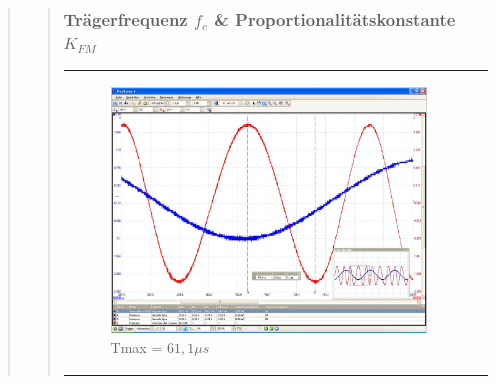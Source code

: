 \begin{quote}
\begin{quote}
\begin{quote}
        \end{quote}
        
        
        
        \subsubsection{Trägerfrequenz $f_c$ \& Proportionalitätskonstante $K_{FM}$}
            
            
            
            \begin{center}
            \begin{tabular}{ll}
            
            \hspace{-3.3cm}
                \begin{minipage}{0.6\textwidth}
                    
                    \begin{figure}[H]
                        \label{fig:Tmax}
                        \includegraphics[scale=0.25, trim = 0mm 0mm 0mm 0mm, clip]{Bilder/Tmax}
                        \caption{Tmax = $61,1 \mu s$}
                    \end{figure}
                    
                \end{minipage}
                

\end{tabular}
\end{center}
\end{quote}
\end{quote}
